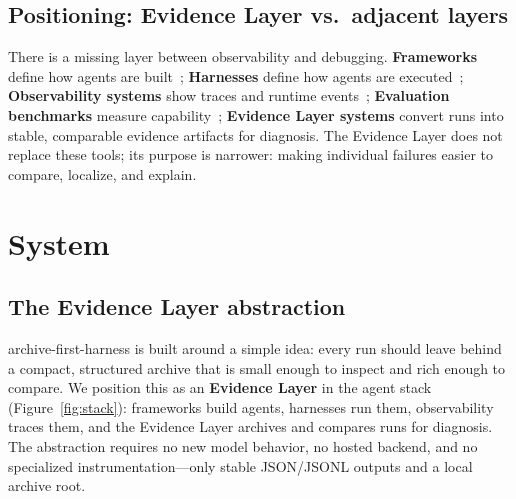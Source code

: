 \documentclass[11pt]{article}
\begin{document}
\subsection{Positioning: Evidence Layer vs.\ adjacent layers}

There is a missing layer between observability and debugging. \textbf{Frameworks} define how agents are built~\cite{guo2024llm,tran2025multi}; \textbf{Harnesses} define how agents are executed~\cite{wang2024openhands}; \textbf{Observability systems} show traces and runtime events~\cite{langsmith,langfuse,braintrust}; \textbf{Evaluation benchmarks} measure capability~\cite{zhou2024webarena,xie2024osworld,jimenez2024swebench,mialon2024gaia,liu2024agentbench}; \textbf{Evidence Layer systems} convert runs into stable, comparable evidence artifacts for diagnosis. The Evidence Layer does not replace these tools; its purpose is narrower: making individual failures easier to compare, localize, and explain.

\section{System}

\subsection{The Evidence Layer abstraction}

archive-first-harness is built around a simple idea: every run should leave behind a compact, structured archive that is small enough to inspect and rich enough to compare. We position this as an \textbf{Evidence Layer} in the agent stack (Figure~\ref{fig:stack}): frameworks build agents, harnesses run them, observability traces them, and the Evidence Layer archives and compares runs for diagnosis. The abstraction requires no new model behavior, no hosted backend, and no specialized instrumentation---only stable JSON/JSONL outputs and a local archive root.
\end{document}
